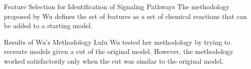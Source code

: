 \documentclass{beamer}
\begin{document}


\begin{frame}{Feature Selection for Identification of Signaling 
Pathways}
The methodology proposed by Wu defines the set of features as a set of 
chemical reactions that can be added to a starting model.
\end{frame}








\begin{frame}{Results of Wu's Methodology}
Lulu Wu tested her methodology by trying to recreate models given a cut
of the original model. \pause However, the methodology worked 
satisfactorily only when the cut was similar to the original model.
\end{frame}

\end{document}
